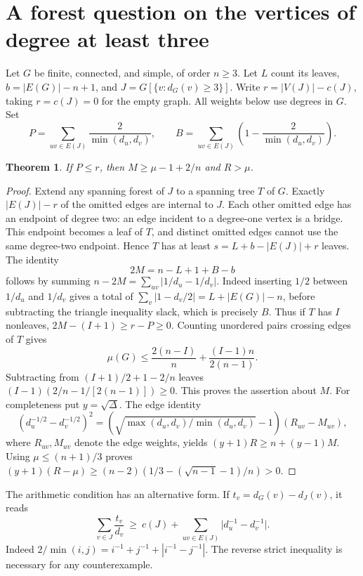 \documentclass[11pt,a4paper]{article}
\newtheorem{theorem}{Theorem}[section]
\begin{document}
\section{A forest question on the vertices of degree at least three}
Let $G$ be finite, connected, and simple, of order $n\ge3$. Let $L$
count its leaves, $b=|E(G)|-n+1$, and $J=G[\{v:d_G(v)\ge3\}]$.
Write $r=|V(J)|-c(J)$, taking $r=c(J)=0$ for the empty graph. All
weights below use degrees in $G$. Set
\[
 P=\sum_{uv\in E(J)}\frac2{\min(d_u,d_v)},\qquad
 B=\sum_{uv\in E(J)}\left(1-\frac2{\min(d_u,d_v)}\right).
\]
\begin{theorem}
If $P\le r$, then $M\ge\mu-1+2/n$ and $R>\mu$.
\end{theorem}
\begin{proof}
Extend any spanning forest of $J$ to a spanning tree $T$ of $G$.
Exactly $|E(J)|-r$ of the omitted edges are internal to $J$.
Each other omitted edge has an endpoint of degree two: an edge
incident to a degree-one vertex is a bridge. This endpoint becomes a
leaf of $T$, and distinct omitted edges cannot use the same degree-two
endpoint. Hence $T$ has at least $s=L+b-|E(J)|+r$ leaves.
The identity
\[
 2M=n-L+1+B-b
\]
follows by summing $n-2M=\sum_{uv}|1/d_u-1/d_v|$.
Indeed inserting $1/2$ between $1/d_u$ and $1/d_v$ gives a total of
$\sum_v|1-d_v/2|=L+|E(G)|-n$, before subtracting the triangle
inequality slack, which is precisely $B$.
Thus if $T$ has $I$ nonleaves, $2M-(I+1)\ge r-P\ge0$.
Counting unordered pairs crossing edges of $T$ gives
\[
 \mu(G)\le\frac{2(n-I)}n+\frac{(I-1)n}{2(n-1)}.
\]
Subtracting from $(I+1)/2+1-2/n$ leaves
$(I-1)(2/n-1/[2(n-1)])\ge0$. This proves the assertion about $M$.
For completeness put $y=\sqrt\Delta$. The edge identity
\[
 (d_u^{-1/2}-d_v^{-1/2})^2
 =(\sqrt{\max(d_u,d_v)/\min(d_u,d_v)}-1)(R_{uv}-M_{uv}),
\]
where $R_{uv},M_{uv}$ denote the edge weights,
yields $(y+1)R\ge n+(y-1)M$. Using $\mu\le(n+1)/3$ proves
$(y+1)(R-\mu)\ge (n-2)(1/3-(\sqrt{n-1}-1)/n)>0$.
\end{proof}
The arithmetic condition has an alternative form. If
$t_v=d_G(v)-d_J(v)$, it reads
\[
 \sum_{v\in J}\frac{t_v}{d_v}
 \ \ge\ c(J)+\sum_{uv\in E(J)}
  \big|d_u^{-1}-d_v^{-1}\big|.
\]
Indeed $2/\min(i,j)=i^{-1}+j^{-1}+|i^{-1}-j^{-1}|$.
The reverse strict inequality is necessary for any counterexample.
\end{document}
